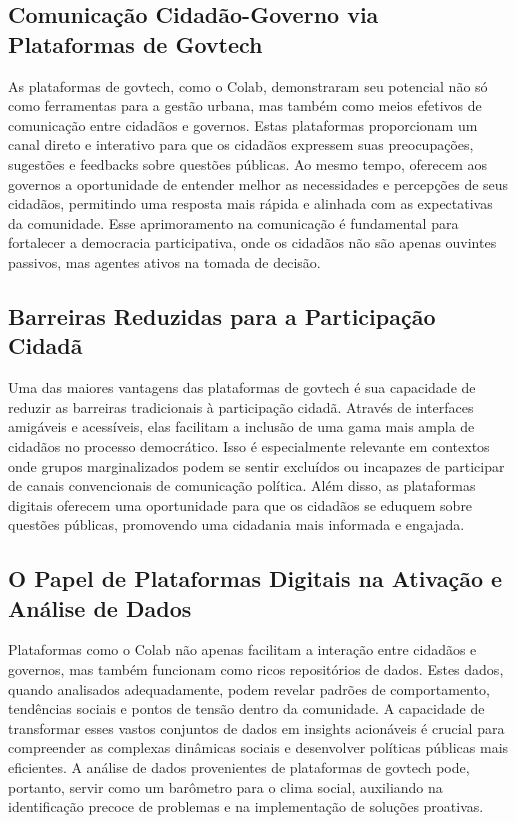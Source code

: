 \subsection*{Comunicação Cidadão-Governo via Plataformas de Govtech}
As plataformas de govtech, como o Colab, demonstraram seu potencial não só como ferramentas para a gestão urbana, mas também como meios efetivos de comunicação entre cidadãos e governos. Estas plataformas proporcionam um canal direto e interativo para que os cidadãos expressem suas preocupações, sugestões e feedbacks sobre questões públicas. Ao mesmo tempo, oferecem aos governos a oportunidade de entender melhor as necessidades e percepções de seus cidadãos, permitindo uma resposta mais rápida e alinhada com as expectativas da comunidade. Esse aprimoramento na comunicação é fundamental para fortalecer a democracia participativa, onde os cidadãos não são apenas ouvintes passivos, mas agentes ativos na tomada de decisão.

\subsection*{Barreiras Reduzidas para a Participação Cidadã}
Uma das maiores vantagens das plataformas de govtech é sua capacidade de reduzir as barreiras tradicionais à participação cidadã. Através de interfaces amigáveis e acessíveis, elas facilitam a inclusão de uma gama mais ampla de cidadãos no processo democrático. Isso é especialmente relevante em contextos onde grupos marginalizados podem se sentir excluídos ou incapazes de participar de canais convencionais de comunicação política. Além disso, as plataformas digitais oferecem uma oportunidade para que os cidadãos se eduquem sobre questões públicas, promovendo uma cidadania mais informada e engajada.

\subsection*{O Papel de Plataformas Digitais na Ativação e Análise de Dados}
Plataformas como o Colab não apenas facilitam a interação entre cidadãos e governos, mas também funcionam como ricos repositórios de dados. Estes dados, quando analisados adequadamente, podem revelar padrões de comportamento, tendências sociais e pontos de tensão dentro da comunidade. A capacidade de transformar esses vastos conjuntos de dados em insights acionáveis é crucial para compreender as complexas dinâmicas sociais e desenvolver políticas públicas mais eficientes. A análise de dados provenientes de plataformas de govtech pode, portanto, servir como um barômetro para o clima social, auxiliando na identificação precoce de problemas e na implementação de soluções proativas.

